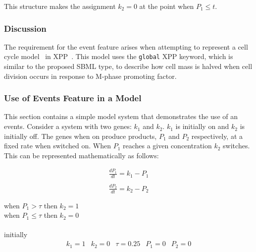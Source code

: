\documentclass[10pt,twocolumntoc]{cekarticle}
\newcommand{\D}{\displaystyle}
\begin{document}
This structure makes the assignment $k_2 = 0$ at the point when
$P_1 \leq t$.

\subsubsection{Discussion}
\label{sec:eventdiscuss}

The requirement for the event feature arises when attempting to represent a
cell cycle model~\citep{novak:2001} in XPP~\citep{ermentrout:2001}.  This
model uses the \texttt{global} XPP keyword, which is similar to the
proposed SBML  type, to describe how cell mass is halved when
cell division occurs in response to M-phase promoting factor.

\subsubsection{Use of Events Feature in a Model}
\label{sec:eventeg}

This section contains a simple model system that demonstrates the
use of an events.  Consider a system with two genes: $k_1$ and
$k_2$.  $k_1$ is initially on and $k_2$ is initially off.  The
genes when on produce products, $P_1$ and $P_2$ respectively, at a
fixed rate when switched on.  When $P_1$ reaches a given
concentration $k_2$ switches.  This can be represented
mathematically as follows:

\begin{equation*}
  \begin{array}{l}
    \D\frac{d P_1}{d t} = k_1 - P_1\\ \\[-4pt]
    \D\frac{d P_2}{d t} = k_2 - P_2\\ \\[-4pt]
  \end{array}
\end{equation*}
when $P_1 > \tau$ then $k_2 = 1$ \\
when $P_1 \leq \tau$ then $k_2 = 0$ \\
\\
initially
\begin{equation*}
  \begin{array}{lllll}
    k_1 = 1 & k_2 = 0 & \tau = 0.25 & P_1 = 0 & P_2 = 0\\ \\[-4pt]
  \end{array}
\end{equation*}
\end{document}
